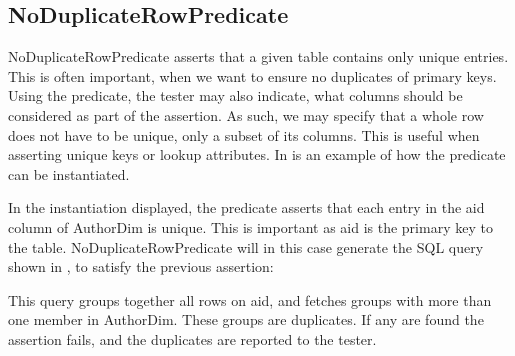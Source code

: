 \subsection{NoDuplicateRowPredicate}
NoDuplicateRowPredicate asserts that a given table contains only unique entries. This is often important, when we want to ensure no duplicates of primary keys. Using the predicate, the tester may also indicate, what columns should be considered as part of the assertion. As such, we may specify that a whole row does not have to be unique, only a subset of its columns. This is useful when asserting unique keys or lookup attributes. In  is an example of how the predicate can be instantiated.


In the instantiation displayed, the predicate asserts that each entry in the aid column of AuthorDim is unique. This is important as aid is the primary key to the table.
NoDuplicateRowPredicate will in this case generate the SQL query shown in , to satisfy the previous assertion:


This query groups together all rows on aid, and fetches groups with more than one member in AuthorDim. These groups are duplicates. If any are found the assertion fails, and the duplicates are reported to the tester.


